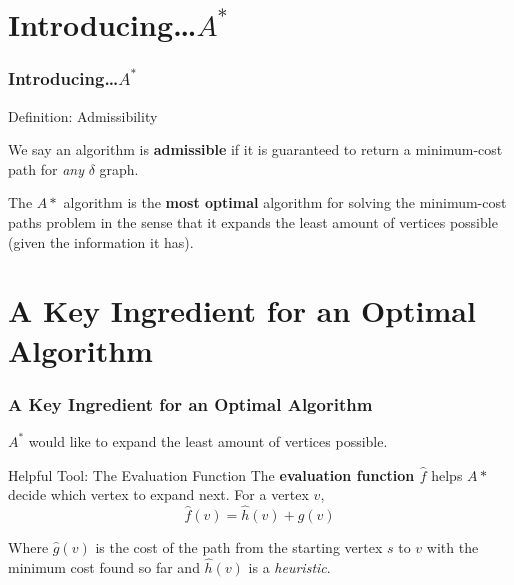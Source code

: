 \documentclass{beamer}
\begin{document}
\section{Introducing\dots $A^*$ }
\begin{frame} 
  \frametitle{Introducing\dots $A^*$ }

  \begin{block}{Definition: Admissibility}
  
  We say an algorithm is \textbf{admissible} if it is guaranteed to 
  return a minimum-cost path for \textit{any} $\delta$ graph.
  \end{block}

The $A*$ algorithm is the \textbf{most optimal} algorithm for solving
the minimum-cost paths problem in the sense that it expands
the least amount of vertices possible (given the information it has).

\end{frame}

\section{A Key Ingredient for an Optimal Algorithm }
\begin{frame} 
  \frametitle{A Key Ingredient for an Optimal Algorithm }

  $A^*$ would like to expand the least amount of vertices possible.

  \begin{block}{Helpful Tool: The Evaluation Function}
    The \textbf{evaluation function $\hat{f}$} helps $A*$ decide which vertex to expand next. For a vertex $v$,
    \begin{equation*}
      \hat{f}(v) = \hat{h}(v) + \hat{g}(v)
    \end{equation*}

    Where $\hat{g}(v)$ is the cost of the path from the starting vertex $s$ to $v$ with the minimum
    cost found so far and $\hat{h}(v)$ is a \textit{heuristic}.
  \end{block}

\end{frame}

\end{document}

